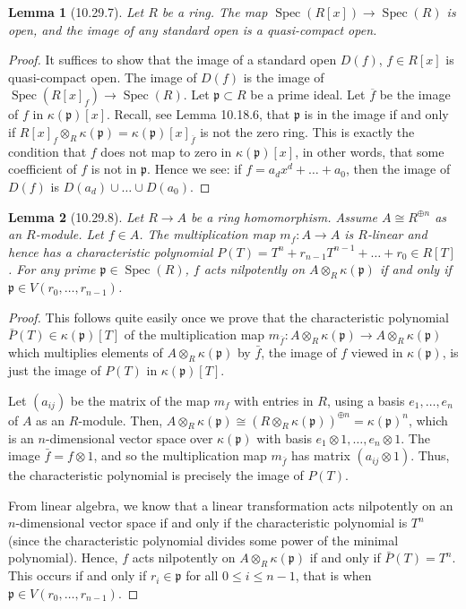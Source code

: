\documentclass[UTF8,11pt]{ctexart}
\newtheorem*{lemma}{Lemma}
\theoremstyle{definition}
\DeclareMathOperator{\Spec}{Spec}
\begin{document}
\begin{lemma}[10.29.7]
Let $R$ be a ring. The map $\Spec(R[x])\to\Spec(R)$ is open, and the image of any standard open is a quasi-compact open.
\end{lemma}
\begin{proof}
It suffices to show that the image of a standard open $D(f)$, $f\in R[x]$ is quasi-compact open. The image of $D(f)$ is the image of $\Spec(R[x]_f)\to\Spec(R)$. Let $\mathfrak p\subset R$ be a prime ideal. Let $\overline f$ be the image of $f$ in $\kappa(\mathfrak p)[x]$. Recall, see Lemma 10.18.6, that $\mathfrak p$ is in the image if and only if $R[x]_f\otimes_R\kappa(\mathfrak p)=\kappa(\mathfrak p)[x]_{\overline f}$ is not the zero ring. This is exactly the condition that $f$ does not map to zero in $\kappa(\mathfrak p)[x]$, in other words, that some coefficient of $f$ is not in $\mathfrak p$. Hence we see: if $f=a_dx^d+\ldots+a_0$, then the image of $D(f)$ is $D(a_d)\cup\ldots\cup D(a_0)$.
\end{proof}
\begin{lemma}[10.29.8]
Let $R\to A$ be a ring homomorphism. Assume $A\cong R^{\oplus n}$ as an $R$-module. Let $f\in A$. The multiplication map $m_f:A\to A$ is $R$-linear and hence has a characteristic polynomial $P(T)=T^n+r_{n-1}T^{n-1}+\ldots+r_0\in R[T]$. For any prime $\mathfrak p\in\Spec(R)$, $f$ acts nilpotently on $A\otimes_R\kappa(\mathfrak p)$ if and only if $\mathfrak p\in V(r_0,\ldots,r_{n-1})$.
\end{lemma}
\begin{proof}
This follows quite easily once we prove that the characteristic polynomial $\bar P(T)\in\kappa(\mathfrak p)[T]$ of the multiplication map $m_{\bar f}:A\otimes_R\kappa(\mathfrak p)\to A\otimes_R\kappa(\mathfrak p)$ which multiplies elements of $A\otimes_R\kappa(\mathfrak p)$ by $\bar f$, the image of $f$ viewed in $\kappa(\mathfrak p)$, is just the image of $P(T)$ in $\kappa(\mathfrak p)[T]$.

Let $(a_{ij})$ be the matrix of the map $m_f$ with entries in $R$, using a basis $e_1,\ldots,e_n$ of $A$ as an $R$-module. Then, $A\otimes_R\kappa(\mathfrak p)\cong(R\otimes_R\kappa(\mathfrak p))^{\oplus n}=\kappa(\mathfrak p)^n$, which is an $n$-dimensional vector space over $\kappa(\mathfrak p)$ with basis $e_1\otimes1,\ldots,e_n\otimes1$. The image $\bar f=f\otimes1$, and so the multiplication map $m_{\bar f}$ has matrix $(a_{ij}\otimes1)$. Thus, the characteristic polynomial is precisely the image of $P(T)$.

From linear algebra, we know that a linear transformation acts nilpotently on an $n$-dimensional vector space if and only if the characteristic polynomial is $T^n$ (since the characteristic polynomial divides some power of the minimal polynomial). Hence, $f$ acts nilpotently on $A\otimes_R\kappa(\mathfrak p)$ if and only if $\bar P(T)=T^n$. This occurs if and only if $r_i\in\mathfrak p$ for all $0\leq i\leq n-1$, that is when $\mathfrak p\in V(r_0,\ldots,r_{n-1})$.
\end{proof}
\end{document}
